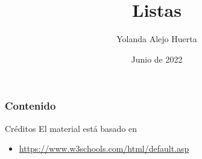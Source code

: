 \documentclass[aspectratio=169]{beamer}
\title{Listas} %
\author{Yolanda Alejo Huerta} %
\institute[CBTIS 246] %
{
 Centro de Bachillerato Tecnológico\\%
 Industrial y de Servicios 246 \\
 El Amo Torres \\
\medskip
\textit{yolanda.alejo@cbtis-246.edu.mx}
}
\date{
  Junio de 2022
} %
\begin{document}
\begin{frame}
    \titlepage
\end{frame}

\begin{frame}
    \frametitle{Contenido}
    \tableofcontents
\end{frame}



\begin{frame}[c]{Créditos}
  El material está basado en
  \begin{itemize}
    \item \href{https://www.w3schools.com/html/default.asp}{https://www.w3schools.com/html/default.asp}
  \end{itemize}
\end{frame}
\end{document}
